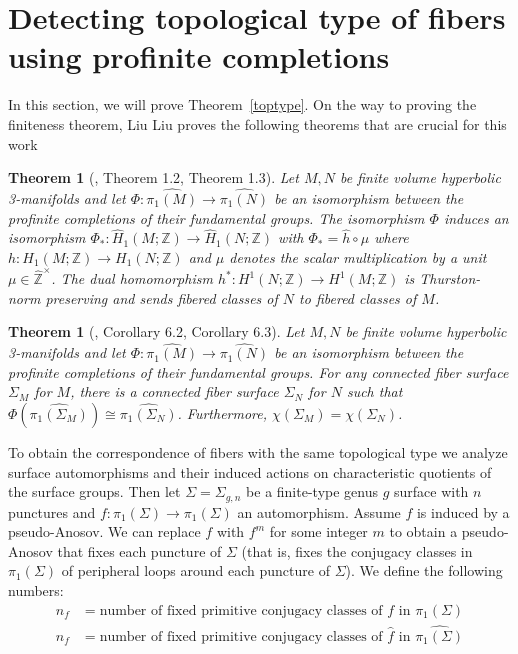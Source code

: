 \documentclass[12pt, reqno,oneside]{amsart}
\newtheorem{theorem}[lemma]{Theorem}
\theoremstyle{definition}
\theoremstyle{plain}
\theoremstyle{TheoremNum}
\newcommand{\Z}{{\mathbb Z}}
\numberwithin{equation}{section}
\numberwithin{table}{section}
\begin{document}
\section{Detecting topological type of fibers using profinite completions}
In this section, we will prove Theorem~\ref{toptype}. On the way to proving the finiteness theorem, Liu \cite{Y} Liu proves the following theorems that are crucial for this work
\begin{theorem}[\cite{Y}, Theorem 1.2, Theorem 1.3]\label{liuthm}
    Let $M, N$ be finite volume hyperbolic 3-manifolds and let $\Phi:\widehat{\pi_1(M)}\to\widehat{\pi_1(N)}$ be an isomorphism between the profinite completions of their fundamental groups. The isomorphism $\Phi$ induces an isomorphism $\Phi_*:\widehat{H}_1(M;\Z)\to \widehat{H}_1(N;\Z)$ with $\Phi_*=\hat{h}\circ \mu$ where $h:H_1(M;\Z)\to H_1(N;\Z)$ and $\mu$ denotes the scalar multiplication by a unit $\mu\in\hat{\Z}^\times$. The dual homomorphism $h^*:H^1(N;\Z)\to H^1(M;\Z)$ is Thurston-norm preserving and sends fibered classes of $N$ to fibered classes of $M$.
\end{theorem}
\begin{theorem}[\cite{Y}, Corollary 6.2, Corollary 6.3]\label{liuthm2}
    Let $M, N$ be finite volume hyperbolic 3-manifolds and let $\Phi:\widehat{\pi_1(M)}\to\widehat{\pi_1(N)}$ be an isomorphism between the profinite completions of their fundamental groups. For any connected fiber surface $\Sigma_M$ for $M$, there is a connected fiber surface $\Sigma_N$ for $N$ such that $\Phi(\widehat{\pi_1(\Sigma_M)})\cong\widehat{\pi_1(\Sigma_N)}$. Furthermore, $\chi(\Sigma_M)=\chi(\Sigma_N)$.
\end{theorem}
To obtain the correspondence of fibers with the same topological type we analyze surface automorphisms and their induced actions on characteristic quotients of the surface groups. Then let $\Sigma=\Sigma_{g,n}$ be a finite-type genus $g$ surface with $n$ punctures and $f:\pi_1(\Sigma)\to\pi_1(\Sigma)$ an automorphism. Assume $f$ is induced by a pseudo-Anosov. We can replace $f$ with $f^m$ for some integer $m$ to obtain a pseudo-Anosov that fixes each puncture of $\Sigma$ (that is, fixes the conjugacy classes in $\pi_1(\Sigma)$ of peripheral loops around each puncture of $\Sigma$). We define the following numbers:
\begin{align*}
    n_f &=\text{number of fixed primitive conjugacy classes of } f \text{ in }\pi_1(\Sigma)\\
    \hat{n}_f &=\text{number of fixed primitive conjugacy classes of }\hat{f} \text{ in } \widehat{\pi_1(\Sigma)}
\end{align*}
\end{document}
